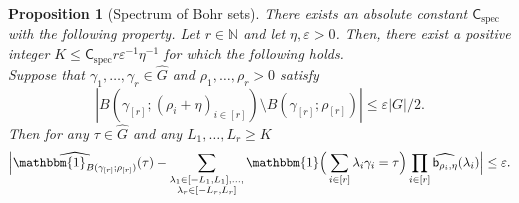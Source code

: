 \documentclass[a4paper,11pt]{article}
\numberwithin{theorem}{section}
\newtheorem{proposition}[theorem]{Proposition}
\theoremstyle{definition}
\newcommand\id{\mathbbm{1}}
\newcommand{\on}[1]{
	\operatorname{#1}
}
\newcommand\ssk[1]{
	\substack{#1}
}
\begin{document}
\begin{proposition}[Spectrum of Bohr sets]\label{bohrsizeLargeFC} There exists an absolute constant $\mathsf{C}_{\on{spec}}$ with the following property. Let $r\in \mathbb{N}$ and let $\eta, \varepsilon > 0$. Then, there exist a positive integer $K \leq \mathsf{C}_{\on{spec}} r \varepsilon^{-1} \eta^{-1}$ for which the following holds.\\
\indent Suppose that $\gamma_1, \dots, \gamma_r \in \hat{G}$ and $\rho_1, \dots, \rho_r > 0$ satisfy 
\begin{equation}|B(\gamma_{[r]}; (\rho_i + \eta)_{i \in [r]}) \setminus B(\gamma_{[r]}; \rho_{[r]})| \leq \varepsilon |G|/2.\label{weakregforbohrfcapprox}\end{equation}
Then for any $\tau \in \hat{G}$ and any $L_1, \dots, L_r \geq K$
\[\Big|\widehat{\id_{B(\gamma_{[r]}; \rho_{[r]})}}(\tau) - \sum_{\ssk{\lambda_1 \in [-L_1, L_1], \dots, \\\lambda_r \in [-L_r, L_r]}} \id\Big(\sum_{i \in [r]} \lambda_i \gamma_i = \tau\Big) \prod_{i \in [r]} \widehat{\mathsf{b}_{\rho_i, \eta}}(\lambda_i)\Big| \leq \varepsilon.\]
\end{proposition}
\end{document}
